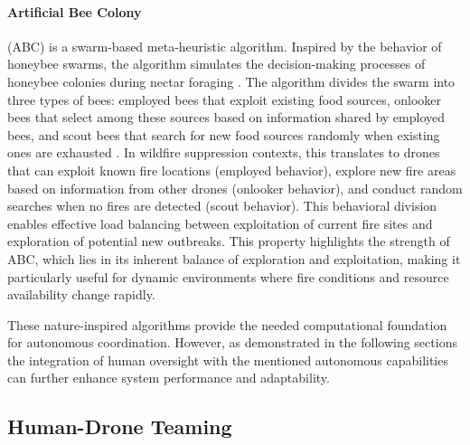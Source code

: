 \documentclass[11pt, a4paper]{article}
\begin{document}
\paragraph{Artificial Bee Colony} (ABC) is a swarm-based meta-heuristic algorithm. Inspired by the behavior of honeybee swarms, the algorithm simulates the decision-making processes of honeybee colonies during nectar foraging \citep{karaboga2007abc}. The algorithm divides the swarm into three types of bees: employed bees that exploit existing food sources, onlooker bees that select among these sources based on information shared by employed bees, and scout bees that search for new food sources randomly when existing ones are exhausted \citep{karaboga2007abc}.
In wildfire suppression contexts, this translates to drones that can exploit known fire locations (employed behavior), explore new fire areas based on information from other drones (onlooker behavior), and conduct random searches when no fires are detected (scout behavior). This behavioral division enables effective load balancing between exploitation of current fire sites and exploration of potential new outbreaks. This property highlights the strength of ABC, which lies in its inherent balance of exploration and exploitation, making it particularly useful for dynamic environments where fire conditions and resource availability change rapidly.

These nature-inspired algorithms provide the needed computational foundation for autonomous coordination. However, as demonstrated in the following sections the integration of human oversight with the mentioned autonomous capabilities can further enhance system performance and adaptability.

\subsection{Human-Drone Teaming}
\end{document}
